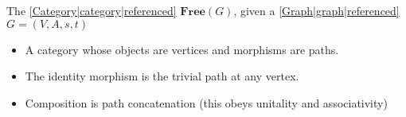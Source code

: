 
The \ref{Category|category|referenced} $\mathbf{Free}(G)$, given a \ref{Graph|graph|referenced} $G=(V,A,s,t)$

\begin{itemize}
    \item  A category whose objects are vertices and morphisms are paths.
    \item The identity morphism is the trivial path at any vertex.
    \item Composition is path concatenation (this obeys unitality and associativity)
  \end{itemize}
